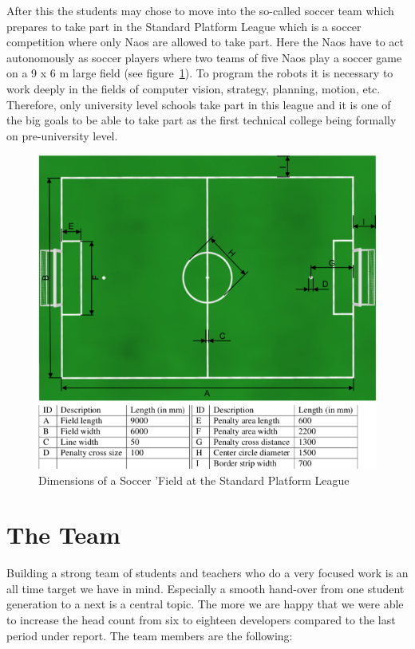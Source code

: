 \documentclass[11pt]{article}
\begin{document}
After this the students may chose to move into the so-called soccer team which prepares to take part in the Standard Platform League which is a soccer competition where only Naos are allowed to take part. Here the Naos have to act autonomously as soccer players where two teams of five Naos play a soccer game on a 9 x 6 m large field (see figure~\ref{fig:soccerField}). To program the robots it is necessary to work deeply in the fields of computer vision, strategy, planning, motion, etc. Therefore, only university level schools take part in this league and it is one of the big goals to be able to take part as the first technical college being formally on pre-university level.

\begin{figure}
\begin{center}
\includegraphics[scale=0.38]{img/soccerField.png}
\end{center}
\caption{Dimensions of a Soccer 'Field at the Standard Platform League}
\label{fig:soccerField}
\end{figure}



\section{The Team}
Building a strong team of students and teachers who do a very focused work is an all time target we have in mind. Especially a smooth hand-over from one student generation to a next is a central topic. The more we are happy that we were able to increase the head count from six  to eighteen developers compared to the last period under report. The team members are the following: 
\end{document}
